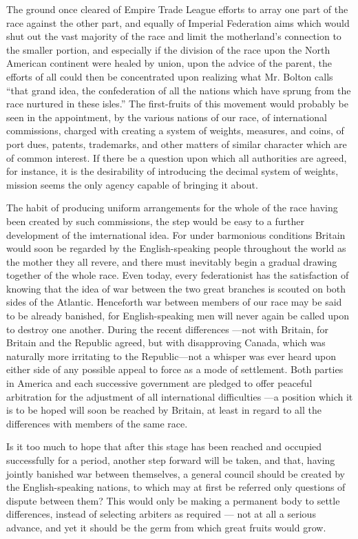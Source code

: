 \documentclass[11pt,openany]{book}
\begin{document}
The ground once cleared of Empire Trade League efforts to array one part of the race against the other part, and equally of Imperial Federation aims which would shut out the vast majority of the race and limit the motherland's connection to the smaller portion, and especially if the division of the race upon the North American continent were healed by union, upon the advice of the parent, the efforts of all could then be concentrated upon realizing what Mr. Bolton calls ``that grand idea, the confederation of all the nations which have sprung from the race nurtured in these isles.'' The first-fruits of this movement would probably be seen in the appointment, by the various nations of our race, of international commissions, charged with creating a system of weights, measures, and coins, of port dues, patents, trademarks, and other matters of similar character which are of common interest. If there be a question upon which all authorities are agreed, for instance, it is the desirability of introducing the decimal system of weights, mission seems the only agency capable of bringing it about.

The habit of producing uniform arrangements for the whole of the race having been created by such commissions, the step would be easy to a further development of the imternational idea. For under barmonious conditions Britain would soon be regarded by the English-speaking people throughout the world as the mother they all revere, and there must inevitably begin a gradual drawing together of the whole race. Even today, every federationist has the satisfaction of knowing that the idea of war between the two great branches is scouted on both sides of the Atlantic. Henceforth war between members of our race may be said to be already banished, for English-speaking men will never again be called upon to destroy one another. During the recent differences ---not with Britain, for Britain and the Republic agreed, but with disapproving Canada, which was naturally more irritating to the Republic---not a whisper was ever heard upon either side of any possible appeal to force as a mode of settlement. Both parties in America and each successive government are pledged to offer peaceful arbitration for the adjustment of all international difficulties ---a position which it is to be hoped will soon be reached by Britain, at least in regard to all the differences with members of the same race.

Is it too much to hope that after this stage has been reached and occupied successfully for a period, another step forward will be taken, and that, having jointly banished war between themselves, a general council should be created by the English-speaking nations, to which may at first be referred only questions of dispute between them? This would only be making a permanent body to settle differences, instead of selecting arbiters as required --- not at all a serious advance, and yet it should be the germ from which great fruits would grow.
\end{document}
